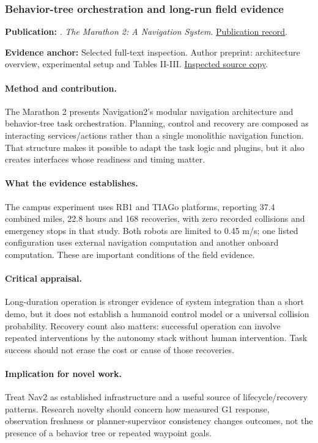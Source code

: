 \subsubsection{Behavior-tree orchestration and long-run field evidence}\label{paper:nav2}
\textbf{Publication:} \citet{nav2}. \emph{The Marathon 2: A Navigation System}. \href{https://doi.org/10.1109/iros45743.2020.9341207}{Publication record}.

\textbf{Evidence anchor:} Selected full-text inspection. Author preprint: architecture overview, experimental setup and Tables II-III. \href{https://arxiv.org/pdf/2003.00368}{Inspected source copy}.

\paragraph{Method and contribution.} The Marathon 2 presents Navigation2's modular navigation architecture and behavior-tree task orchestration. Planning, control and recovery are composed as interacting services/actions rather than a single monolithic navigation function. That structure makes it possible to adapt the task logic and plugins, but it also creates interfaces whose readiness and timing matter.

\paragraph{What the evidence establishes.} The campus experiment uses RB1 and TIAGo platforms, reporting 37.4 combined miles, 22.8 hours and 168 recoveries, with zero recorded collisions and emergency stops in that study. Both robots are limited to 0.45 m/s; one listed configuration uses external navigation computation and another onboard computation. These are important conditions of the field evidence.

\paragraph{Critical appraisal.} Long-duration operation is stronger evidence of system integration than a short demo, but it does not establish a humanoid control model or a universal collision probability. Recovery count also matters: successful operation can involve repeated interventions by the autonomy stack without human intervention. Task success should not erase the cost or cause of those recoveries.

\paragraph{Implication for novel work.} Treat Nav2 as established infrastructure and a useful source of lifecycle/recovery patterns. Research novelty should concern how measured G1 response, observation freshness or planner-supervisor consistency changes outcomes, not the presence of a behavior tree or repeated waypoint goals.


